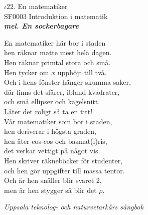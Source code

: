 \documentclass[a6paper,10pt]{article}
\newcommand{\mel}[1]{\small\textbf{\textit{mel. #1 \\}}}
\begin{document}
\setlength{\oddsidemargin}{-0.47in}
\noindent
\begin{center}
\Large $\iota22$. En matematiker\\
\footnotesize SF0003 Introduktion i matematik\\
\mel{En sockerbagare}
\end{center}
En matematiker här bor i staden \\
hen räknar matte mest hela dagen. \\
Hen räknar primtal stora och små. \\
Hen tycker om $x$ upphöjt till två. \\
Och i hens fönster hänger skumma saker, \\
där finns det sfärer, ibland kvadrater, \\
och små ellipser och kägelsnitt. \\
Låter det roligt så ta en titt! 
\vspace{5pt} \\
Vår matematiker som bor i staden, \\
hen deriverar i högsta graden, \\
hen äter cos-cos och basmat(i)ris, \\
det verkar vettigt på något vis. \\
Hen skriver räkneböcker för studenter, \\
och hen gör uppgifter till massa tentor. \\
Och är hen snäller blir svaret 2, \\
men är hen stygger så blir det $\rho$. 
\begin{flushright}
\textit{Uppsala teknolog- och naturvetarkårs sångbok}
\end{flushright}
\end{document}
